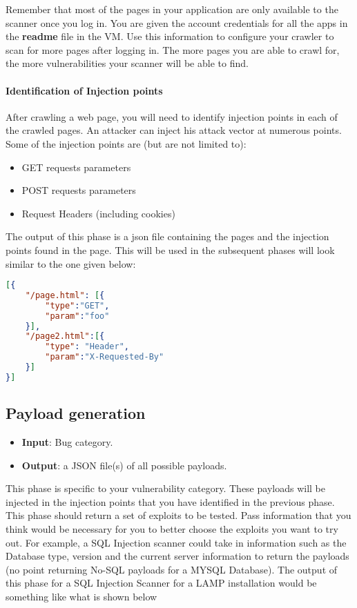 \documentclass{article}[10pt]
\begin{document}
Remember that most of the pages in your application are only available to the scanner once you log in. You are given the account credentials for all the apps in the {\bf readme} file in the VM. Use this information to configure your crawler to scan for more pages after logging in. The more pages you are able to crawl for, the more vulnerabilities your scanner will be able to find.

\paragraph{Identification of Injection points}
After crawling a web page, you will need to identify injection points in each of the crawled pages. An attacker can inject his attack vector at numerous points. Some of the injection points are (but are not limited to):
	\begin{itemize}
	\item GET requests parameters
	\item POST requests parameters
	\item Request Headers (including cookies)
	\end{itemize}

The output of this phase is a json file containing the pages and the injection points found in the page.
This will be used in the subsequent phases will look similar to the one given below:
\begin{lstlisting}[language=json,firstnumber=1]
[{
	"/page.html": [{
		"type":"GET",
		"param":"foo"
	}],
	"/page2.html":[{
		"type": "Header",
		"param":"X-Requested-By"
	}]
}]
\end{lstlisting}

\subsection{Payload generation}
\begin{itemize}
	\item \textbf{Input}: Bug category.
	\item \textbf{Output}: a JSON file(s) of all possible payloads.
\end{itemize}
This phase is specific to your vulnerability category. These payloads will be injected in the injection points that you have identified in the previous phase. 
This phase should return a set of exploits to be tested. Pass information that you think would be necessary for you to better choose the exploits you want to try out. For example, a SQL Injection scanner could take in information such as the Database type, version and the current server information to return the payloads (no point returning No-SQL payloads for a MYSQL Database). The output of this phase for a SQL Injection Scanner for a LAMP installation would be something like what is shown below
\end{document}
